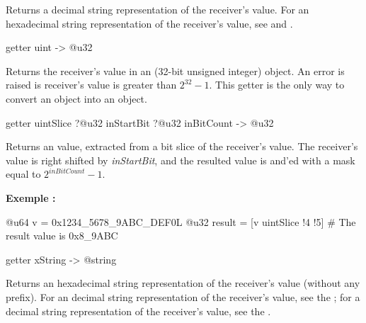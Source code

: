 Returns a decimal string representation of the receiver's value. For an hexadecimal string representation of the receiver's value, see  and .




\begin{galgas4}
getter uint -> @u32
\end{galgas4}

Returns the receiver's value in an  (32-bit unsigned integer) object. An error is raised is receiver's value is greater than $2^{32}-1$. This getter is the only way to convert an  object into an  object.



\begin{galgas4}
getter uintSlice ?@u32 inStartBit ?@u32 inBitCount -> @u32
\end{galgas4}



Returns an  value, extracted from a bit slice of the receiver's value. The receiver's value is right shifted by \emph{inStartBit}, and the resulted value is and'ed with a mask equal to $2^{inBitCount}-1$.


\textbf{Exemple :}
\begin{galgas4}
@u64 v = 0x1234_5678_9ABC_DEF0L
@u32 result = [v uintSlice !4 !5] # The result value is 0x8_9ABC
\end{galgas4}






\begin{galgas4}
getter xString -> @string
\end{galgas4}

Returns an hexadecimal string representation of the receiver's value (without any prefix). For an decimal string representation of the receiver's value, see the ; for a decimal string representation of the receiver's value, see the .










